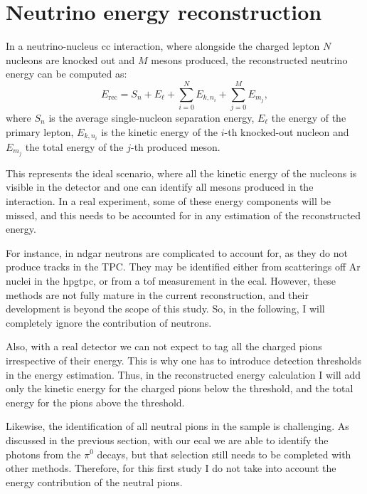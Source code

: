 \section{Neutrino energy reconstruction}
\label{sec:gar_energy}

In a neutrino-nucleus \gls{cc} interaction, where alongside the charged lepton $N$ nucleons are knocked out and $M$ mesons produced, the reconstructed neutrino energy can be computed as:
\begin{equation}
    E_{\mathrm{rec}} = S_{n} + E_{\ell} + \sum_{i=0}^{N} E_{k,n_{i}} + \sum_{j=0}^{M} E_{m_{j}},
\end{equation}
where $S_{n}$ is the average single-nucleon separation energy, $E_{\ell}$ the energy of the primary lepton, $E_{k,n_{i}}$ is the kinetic energy of the $i$-th knocked-out nucleon and $E_{m_{j}}$ the total energy of the $j$-th produced meson.

This represents the ideal scenario, where all the kinetic energy of the nucleons is visible in the detector and one can identify all mesons produced in the interaction. In a real experiment, some of these energy components will be missed, and this needs to be accounted for in any estimation of the reconstructed energy.

For instance, in \gls{ndgar} neutrons are complicated to account for, as they do not produce tracks in the TPC. They may be identified either from scatterings off Ar nuclei in the \gls{hpgtpc}, or from a \gls{tof} measurement in the \gls{ecal}. However, these methods are not fully mature in the current reconstruction, and their development is beyond the scope of this study. So, in the following, I will completely ignore the contribution of neutrons.

Also, with a real detector we can not expect to tag all the charged pions irrespective of their energy. This is why one has to introduce detection thresholds in the energy estimation. Thus, in the reconstructed energy calculation I will add only the kinetic energy for the charged pions below the threshold, and the total energy for the  pions above the threshold.

Likewise, the identification of all neutral pions in the sample is challenging. As discussed in the previous section, with our \gls{ecal} we are able to identify the photons from the $\pi^{0}$ decays, but that selection still needs to be completed with other methods. Therefore, for this first study I do not take into account the energy contribution of the neutral pions.


